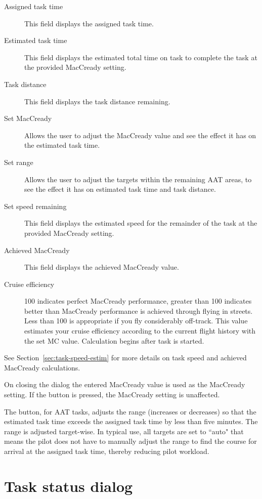 \begin{description}
\item[Assigned task time]  This field displays the assigned task time.
\item[Estimated task time]  This field displays the estimated total time 
 on task to complete the task at the provided MacCready setting.
\item[Task distance]  This field displays the task distance remaining.
\item[Set MacCready]  Allows the user to adjust the MacCready value and 
 see the effect it has on the estimated task time.
\item[Set range]  Allows the user to adjust the targets within the remaining 
 AAT areas, to see the effect it has on estimated task time and task distance.
\item[Set speed remaining]  This field displays the estimated speed for the
 remainder of the task at the provided MacCready setting.
\item[Achieved MacCready]  This field displays the achieved MacCready value.
\item[Cruise efficiency]  100 indicates perfect MacCready performance, greater 
than 100 indicates better than MacCready performance is achieved through flying
in streets. Less than 100 is appropriate if you fly considerably off-track. This 
value estimates your cruise efficiency according to the current flight history 
with the set MC value. Calculation begins after task is started.
\end{description}
See Section~\ref{sec:task-speed-estim} for more details on task speed
and achieved MacCready calculations.

On closing the dialog the entered MacCready value is used as the MacCready 
setting. If the  button is pressed, the MacCready setting is 
unaffected.

The  button, for AAT tasks, adjusts the range
(increases or decreases) so that the estimated task time exceeds the
assigned task time by less than five minutes.  The range is adjusted
target-wise. In typical use, all targets are set to ``auto" that means the pilot 
does not have to manually adjust the range to find the course for arrival at 
the assigned task time, thereby reducing pilot workload.


\section{Task status dialog}

